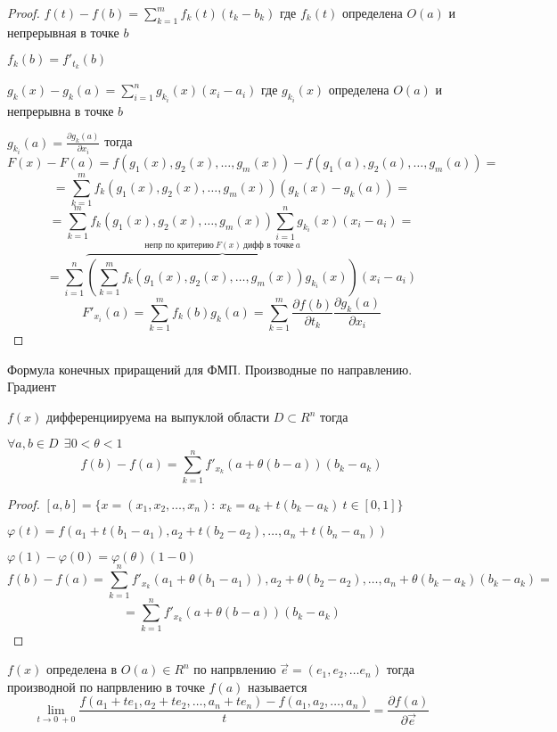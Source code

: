 \begin{proof}
  $f(t) - f(b) = \sum_{k=1}^m f_k(t)(t_k - b_k)$ где $f_k(t)$ определена $O(a)$
  и непрерывная в точке $b$

  $f_k(b) = f'_{t_k}(b)$

  $g_k(x) - g_k(a) =
  \sum_{i=1}^n g_{k_i}(x)(x_i - a_i)$ где $g_{k_i}(x)$ определена $O(a)$ и
  непрерывна в точке $b$

  $g_{k_i}(a) = \frac{\partial g_k(a)}{\partial x_i}$ тогда
  $$
  F(x) - F(a) = f(g_1(x), g_2(x), \ldots, g_m(x)) - f(g_1(a), g_2(a),
  \ldots, g_m(a)) =
  $$
  $$
  = \sum_{k=1}^m f_k(g_1(x), g_2(x), \ldots, g_m(x)) (g_k(x) - g_k(a)) =
  $$
  $$
  = \sum_{k=1}^m f_k(g_1(x), g_2(x), \ldots, g_m(x)) \sum_{i=1}^n g_{k_i}(x)
  (x_i - a_i)=
  $$
  $$
  = \sum_{i=1}^n \overbrace{\left( \sum_{k=1}^m f_k(g_1(x), g_2(x), \ldots,
  g_m(x)) g_{k_i}(x) \right)}^{\text{непр по критерию} ~ F(x) ~
  \text{дифф в точке} ~ a} (x_i - a_i)
  $$
  $$
  F'_{x_i}(a) = \sum_{k=1}^m f_k(b) g_k(a) = \sum_{k=1}^m
  \frac{\partial f(b)}{\partial t_k} \frac{\partial g_k(a)}{\partial x_i}
  $$
\end{proof}

\begin{title}[\Large]
  Формула конечных приращений для ФМП. Производные по направлению. Градиент
\end{title}

\begin{theorem}
  $f(x)$ дифференциируема на выпуклой области $D \subset R^n$ тогда

  $\forall a,b \in D ~~ \exists 0 < \theta < 1$
  $$
  f(b) - f(a) = \sum_{k=1}^n f'_{x_k} (a + \theta(b-a))(b_k-a_k)
  $$
\end{theorem}

\begin{proof}
  $[a,b] = \{x = (x_1, x_2, \ldots, x_n): ~ x_k = a_k + t(b_k - a_k) ~
  t \in [0,1]\}$

  $\varphi(t) = f(a_1 + t(b_1 - a_1), a_2 + t(b_2 - a_2), \ldots,
  a_n + t(b_n-a_n))$

  $\varphi(1) - \varphi(0) = \varphi(\theta) (1 - 0)$
  $$
  f(b) - f(a) = \sum_{k=1}^n f'_{x_k}(a_1 + \theta(b_1 - a_1)),
  a_2 + \theta(b_2 - a_2), \ldots, a_n + \theta(b_k - a_k) (b_k - a_k) =
  $$
  $$
  = \sum_{k=1}^n f'_{x_k}(a + \theta(b-a))(b_k - a_k)
  $$
\end{proof}

\begin{define}
  $f(x)$ определена в $O(a) \in R^n$ по напрвлению
  $\vec e = (e_1, e_2, \ldots e_n)$ тогда производной по напрвлению в точке
  $f(a)$ называется
  $$
  \lim_{t \to 0 ~ +0} \frac{f(a_1 + te_1, a_2 + te_2, \ldots, a_n + te_n) -
  f(a_1, a_2, \ldots, a_n)}{t} = \frac{\partial f(a)}{\partial \vec e}
  $$
\end{define}

